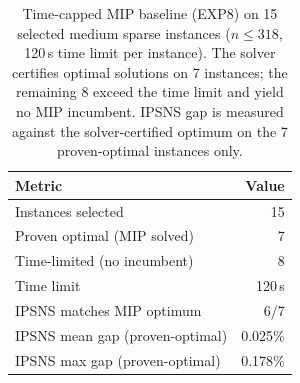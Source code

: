 \begin{table}[t]
\centering
\caption{Time-capped MIP baseline (EXP8) on 15 selected medium sparse instances
($n \leq 318$, 120\,s time limit per instance). The solver certifies optimal
solutions on 7 instances; the remaining 8 exceed the time limit and yield no MIP
incumbent. IPSNS gap is measured against the solver-certified optimum on the 7
proven-optimal instances only.}
\label{tab:medium-mip-baseline}
\begin{tabular}{lr}
\toprule
Metric & Value \\
\midrule
Instances selected & 15 \\
Proven optimal (MIP solved) & 7 \\
Time-limited (no incumbent) & 8 \\
Time limit & 120\,s \\
IPSNS matches MIP optimum & 6/7 \\
IPSNS mean gap (proven-optimal) & 0.025\% \\
IPSNS max gap (proven-optimal) & 0.178\% \\
\bottomrule
\end{tabular}
\end{table}
